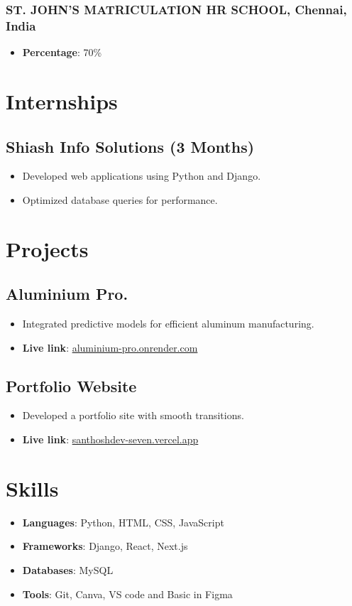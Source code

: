 \documentclass[11pt]{article}
\begin{document}
\subsubsection{ST. JOHN'S MATRICULATION HR SCHOOL, Chennai, India}
\begin{itemize}
    \item \textbf{Percentage}: 70\%
\end{itemize}

\section{Internships}
\subsection{Shiash Info Solutions (3 Months)}
\begin{itemize}
    \item Developed web applications using Python and Django.
    \item Optimized database queries for performance.
\end{itemize}

\section{Projects}
\subsection{Aluminium Pro.} 
\begin{itemize}
    \item Integrated predictive models for efficient aluminum manufacturing. 
    \item \textbf{Live link}: \href{https://aluminium-pro.onrender.com/}{aluminium-pro.onrender.com}
\end{itemize}
\subsection{Portfolio Website} 
\begin{itemize}
    \item Developed a portfolio site with smooth transitions.
    \item \textbf{Live link}: \href{https://santhoshdev-seven.vercel.app/}{santhoshdev-seven.vercel.app}
\end{itemize}

\section{Skills}
\begin{itemize}
    \item \textbf{Languages}: Python, HTML, CSS, JavaScript
    \item \textbf{Frameworks}: Django, React, Next.js
    \item \textbf{Databases}: MySQL
    \item \textbf{Tools}: Git, Canva, VS code and  Basic in Figma
\end{itemize}
\end{document}
